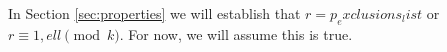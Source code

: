 In Section \ref{sec:properties} we will establish that $r={p_exclusions_list}$ or $r\equiv 1,{ell}\pmod{{k}}$. For now, we will assume this is true.